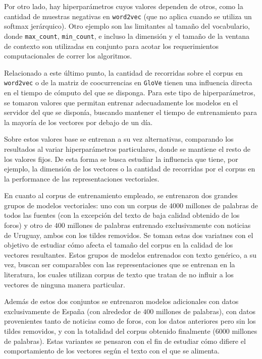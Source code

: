 Por otro lado, hay hiperparámetros cuyos valores dependen de otros, como la cantidad de muestras
negativas en \texttt{word2vec} (que no aplica cuando se utiliza un softmax jerárquico). Otro ejemplo
son las limitantes al tamaño del vocabulario, donde \texttt{max\_count}, \texttt{min\_count}, e
incluso la dimensión y el tamaño de la ventana de contexto son utilizadas en conjunto para acotar
los requerimientos computacionales de correr los algoritmos.

Relacionado a este último punto, la cantidad de recorridas sobre el corpus en \texttt{word2vec} o de
la matriz de coocurrencias en \texttt{GloVe} tienen una influencia directa en el tiempo de cómputo
del que se disponga. Para este tipo de hiperparámetros, se tomaron valores que permitan entrenar
adecuadamente los modelos en el servidor del que se disponía, buscando mantener el tiempo de
entrenamiento para la mayoría de los vectores por debajo de un día.

Sobre estos valores base se entrenan a su vez alternativas, comparando los resultados al variar
hiperparámetros particulares, donde se mantiene el resto de los valores fijos. De esta forma se
busca estudiar la influencia que tiene, por ejemplo, la dimensión de los vectores o la cantidad de
recorridas por el corpus en la performance de las representaciones vectoriales.


En cuanto al corpus de entrenamiento empleado, se entrenaron dos grandes grupos de modelos
vectoriales: uno con un corpus de $4000$ millones de palabras de todos las fuentes (con la excepción
del texto de baja calidad obtenido de los foros) y otro de $400$ millones de palabras entrenado
exclusivamente con noticias de Uruguay, ambos con los tildes removidos. Se toman estas dos variatnes
con el objetivo de estudiar cómo afecta el tamaño del corpus en la calidad de los vectores
resultantes. Estos grupos de modelos entrenados con texto genérico, a su vez, buscan ser comparables
con las representaciones que se entrenan en la literatura, los cuales utilizan corpus de texto que
tratan de no influir a los vectores de ninguna manera particular.

Además de estos dos conjuntos se entrenaron modelos adicionales con datos exclusivamente de España
(con alrededor de $400$ millones de palabras), con datos provenientes tanto de noticias como de
foros, con los datos anteriores pero sin los tildes removidos, y con la totalidad del corpus
obtenido finalmente ($6000$ millones de palabras). Estas variantes se pensaron con el fin de
estudiar cómo difiere el comportamiento de los vectores según el texto con el que se alimenta.

